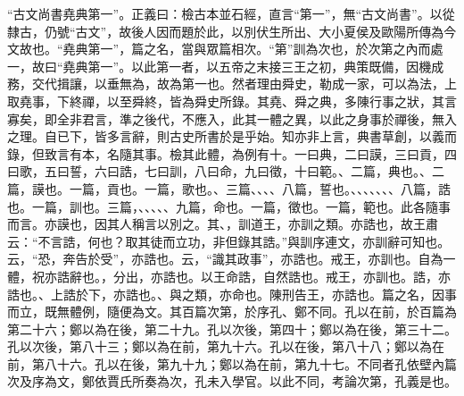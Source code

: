  {\noindent\shu{}\fzkt “古文尚書堯典第一”。正義曰：檢古本並石經，直言“第一”，無“古文尚書”。以從隸古，仍號“古文”，故後人因而題於此，以別伏生所出、大小夏侯及歐陽所傳為今文故也。“堯典第一”，篇之名，當與眾篇相次。“第”訓為次也，於次第之內而處一，故曰“堯典第一”。以此第一者，以五帝之末接三王之初，典策既備，因機成務，交代揖讓，以垂無為，故為第一也。然者理由舜史，勒成一家，可以為法，上取堯事，下終禪，以至舜終，皆為舜史所錄。其堯、舜之典，多陳行事之狀，其言寡矣，即全非君言，準之後代，不應入，此其一體之異，以此之身事於禪後，無入之理。自已下，皆多言辭，則古史所書於是乎始。知亦非上言，典書草創，以義而錄，但致言有本，名隨其事。檢其此體，為例有十。一曰典，二曰謨，三曰貢，四曰歌，五曰誓，六曰誥，七曰訓，八曰命，九曰徵，十曰範。、二篇，典也。、二篇，謨也。一篇，貢也。一篇，歌也。、三篇、、、、八篇，誓也。、、、、、、、八篇，誥也。一篇，訓也。三篇，、、、、、九篇，命也。一篇，徵也。一篇，範也。此各隨事而言。亦謨也，因其人稱言以別之。其、，訓道王，亦訓之類。亦誥也，故王肅云：“不言誥，何也？取其徒而立功，非但錄其誥。”與訓序連文，亦訓辭可知也。云，“恐，奔告於受”，亦誥也。云，“識其政事”，亦誥也。戒王，亦訓也。自為一體，祝亦誥辭也。，分出，亦誥也。以王命誥，自然誥也。戒王，亦訓也。誥，亦誥也。、上誥於下，亦誥也。、與之類，亦命也。陳刑告王，亦誥也。篇之名，因事而立，既無體例，隨便為文。其百篇次第，於序孔、鄭不同。孔以在前，於百篇為第二十六；鄭以為在後，第二十九。孔以次後，第四十；鄭以為在後，第三十二。孔以次後，第八十三；鄭以為在前，第九十六。孔以在後，第八十八；鄭以為在前，第八十六。孔以在後，第九十九；鄭以為在前，第九十七。不同者孔依壁內篇次及序為文，鄭依賈氏所奏為次，孔未入學官。以此不同，考論次第，孔義是也。 \par}

